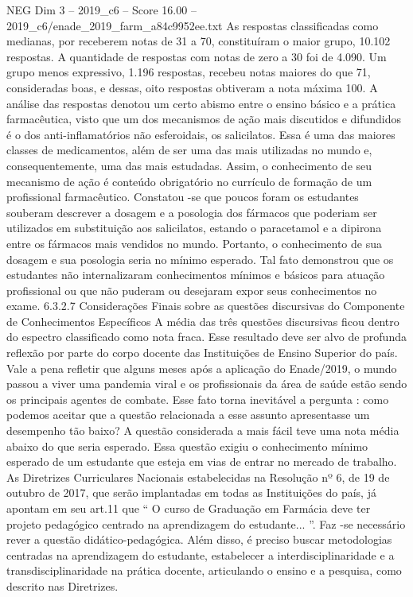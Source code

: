 \begin{textsample}{NEG Dim 3 – 2019\_c6 – Score 16.00 – 2019\_c6/enade\_2019\_farm\_a84c9952ee.txt}
As respostas classificadas como medianas, por receberem notas de 31 a 70, constituíram o maior grupo, 10.102 respostas.
A quantidade de respostas com notas de zero a 30 foi de 4.090.
Um grupo menos expressivo, 1.196 respostas, recebeu notas maiores do que 71, consideradas boas, e dessas, oito respostas obtiveram a nota máxima 100.
A análise das respostas denotou um certo abismo entre o ensino básico e a prática farmacêutica, visto que um dos mecanismos de ação mais discutidos e difundidos é o dos anti-inflamatórios não esferoidais, os salicilatos.
Essa é uma das maiores classes de medicamentos, além de ser uma das mais utilizadas no mundo e, consequentemente, uma das mais estudadas.
Assim, o conhecimento de seu mecanismo de ação é conteúdo obrigatório no currículo de formação de um profissional farmacêutico.
Constatou -se que poucos foram os estudantes souberam descrever a dosagem e a posologia dos fármacos que poderiam ser utilizados em substituição aos salicilatos, estando o paracetamol e a dipirona entre os fármacos mais vendidos no mundo.
Portanto, o conhecimento de sua dosagem e sua posologia seria no mínimo esperado.
Tal fato demonstrou que os estudantes não internalizaram conhecimentos mínimos e básicos para atuação profissional ou que não puderam ou desejaram expor seus conhecimentos no exame. 6.3.2.7 Considerações Finais sobre as questões discursivas do Componente de Conhecimentos Específicos A média das três questões discursivas ficou dentro do espectro classificado como nota fraca.
Esse resultado deve ser alvo de profunda reflexão por parte do corpo docente das Instituições de Ensino Superior do país.
Vale a pena refletir que alguns meses após a aplicação do Enade/2019, o mundo passou a viver uma pandemia viral e os profissionais da área de saúde estão sendo os principais agentes de combate.
Esse fato torna inevitável a pergunta : como podemos aceitar que a questão relacionada a esse assunto apresentasse um desempenho tão baixo?
A questão considerada a mais fácil teve uma nota média abaixo do que seria esperado.
Essa questão exigiu o conhecimento mínimo esperado de um estudante que esteja em vias de entrar no mercado de trabalho.
As Diretrizes Curriculares Nacionais estabelecidas na Resolução nº 6, de 19 de outubro de 2017, que serão implantadas em todas as Instituições do país, já apontam em seu art.11 que “ O curso de Graduação em Farmácia deve ter projeto pedagógico centrado na aprendizagem do estudante... ”.
Faz -se necessário rever a questão didático-pedagógica.
Além disso, é preciso buscar metodologias centradas na aprendizagem do estudante, estabelecer a interdisciplinaridade e a transdisciplinaridade na prática docente, articulando o ensino e a pesquisa, como descrito nas Diretrizes.

\end{textsample}
